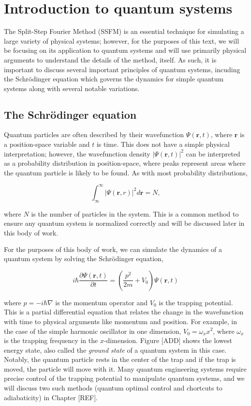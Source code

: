 \chapter*{Introduction to quantum systems}

The Split-Step Fourier Method (SSFM) is an essential technique for simulating a large variety of physical systems; however, for the purposes of this text, we will be focusing on its application to quantum systems and will use primarily physical arguments to understand the details of the method, itself.
As such, it is important to discuss several important principles of quantum systems, incuding the Schr\"odinger equation which governs the dynamics for simple quantum systems along with several notable variations.

\section{The Schr\"odinger equation}
Quantum particles are often described by their wavefunction $\Psi(\mathbf{r},t)$, where $\mathbf{r}$ is a position-space variable and $t$ is time.
This does not have a simple physical interpretation; however, the wavefunction density $|\Psi(\mathbf{r},t)|^2$ can be interpreted as a probability distribution in position-space, where peaks represent areas where the quantum particle is likely to be found.
As with most probability distributions,

\begin{equation}
    \int_\infty^\infty |\Psi(\mathbf{r},r)|^2 d\mathbf{r} = N,
\end{equation}

where $N$ is the number of particles in the system.
This is a common method to ensure any quantum system is normalized correctly and will be discussed later in this body of work.

For the purposes of this body of work, we can simulate the dynamics of a quantum system by solving the Schr\"odinger equation,

\begin{equation}
    i\hbar\frac{\partial\Psi(\mathbf{r},t)}{\partial t} = \left(\frac{p^2}{2m} + V_0\right) \Psi(\mathbf{r},t)
    \label{eqn:schrody}
\end{equation}

where $p = -i\hbar\nabla$ is the momentum operator and $V_0$ is the trapping potential.
This is a partial differential equation that relates the change in the wavefunction with time to physical arguments like momentum and position.
For example, in the case of the simple harmonic oscillator in one dimension, $V_0 = \omega_x x^2$, where $\omega_x$ is the trapping frequency in the $x$-dimension.
Figure [ADD] shows the lowest energy state, also called the \textit{ground state} of a quantum system in this case.
Notably, the quantum particle rests in the center of the trap and if the trap is moved, the particle will move with it.
Many quantum engineering systems require precise control of the trapping potential to manipulate quantum systems, and we will discuss two such methods (quantum optimal control and chortcuts to adiabaticity) in Chapter [REF].

